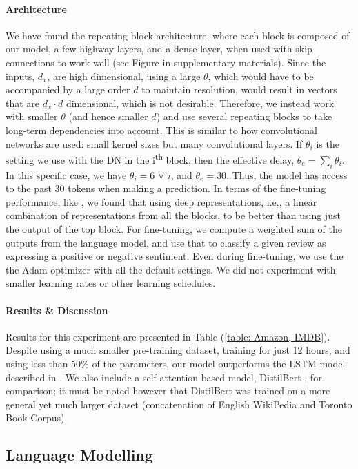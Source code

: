 \documentclass{article}
\begin{document}
\paragraph{Architecture} We have found the repeating block architecture, where each block is composed of our model, a few highway layers, and a dense layer, when used with skip connections to work well (see Figure in supplementary materials). Since the inputs, $d_x$, are high dimensional, using a large $\theta$, which would have to be accompanied by a large order $d$ to maintain resolution, would result in  vectors that are $d_x \cdot d$ dimensional, which is not desirable. Therefore, we instead work with smaller $\theta$ (and hence smaller $d$) and use several repeating blocks to take long-term dependencies into account. This is similar to how convolutional networks are used: small kernel sizes but many convolutional layers. If $\theta_i$ is the setting we use with the DN in the i\textsuperscript{th} block, then the effective delay, $\theta_e = \sum_i \theta_i$. In this specific case, we have $\theta_{i} = 6 \,\, \forall \,\, i$, and $\theta_e = 30$. Thus, the model has access to the past 30 tokens when making a prediction. In terms of the fine-tuning performance, like \citet{Peters:2018}, we found that using deep representations, i.e., a linear combination of representations from all the blocks, to be better than using just the output of the top block. For fine-tuning, we compute a weighted sum of the outputs from the language model, and use that to classify a given review as expressing a positive or negative sentiment. Even during fine-tuning, we use the the Adam optimizer with all the default settings. We did not experiment with smaller learning rates or other learning schedules. 

\paragraph{Results \& Discussion} Results for this experiment are presented in Table (\ref{table: Amazon, IMDB}). Despite using a much smaller pre-training dataset, training for just 12 hours, and using less than 50\% of the parameters, our model outperforms the LSTM model described in \citet{radford2017learning}. We also include a self-attention based model, DistilBert \cite{sanh2019distilbert}, for comparison; it must be noted however that DistilBert was trained on a more general yet much larger dataset (concatenation of English WikiPedia and Toronto Book Corpus). 


\subsection{Language Modelling}
\end{document}
